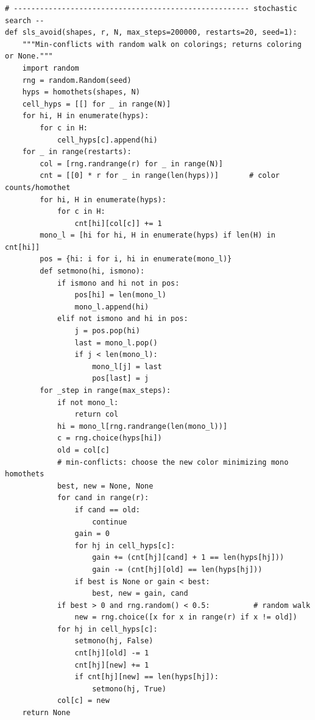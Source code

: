 \documentclass[12pt]{article}
\begin{document}
\begin{lstlisting}[style=plainstyle]
# ------------------------------------------------------ stochastic search --
def sls_avoid(shapes, r, N, max_steps=200000, restarts=20, seed=1):
    """Min-conflicts with random walk on colorings; returns coloring or None."""
    import random
    rng = random.Random(seed)
    hyps = homothets(shapes, N)
    cell_hyps = [[] for _ in range(N)]
    for hi, H in enumerate(hyps):
        for c in H:
            cell_hyps[c].append(hi)
    for _ in range(restarts):
        col = [rng.randrange(r) for _ in range(N)]
        cnt = [[0] * r for _ in range(len(hyps))]       # color counts/homothet
        for hi, H in enumerate(hyps):
            for c in H:
                cnt[hi][col[c]] += 1
        mono_l = [hi for hi, H in enumerate(hyps) if len(H) in cnt[hi]]
        pos = {hi: i for i, hi in enumerate(mono_l)}
        def setmono(hi, ismono):
            if ismono and hi not in pos:
                pos[hi] = len(mono_l)
                mono_l.append(hi)
            elif not ismono and hi in pos:
                j = pos.pop(hi)
                last = mono_l.pop()
                if j < len(mono_l):
                    mono_l[j] = last
                    pos[last] = j
        for _step in range(max_steps):
            if not mono_l:
                return col
            hi = mono_l[rng.randrange(len(mono_l))]
            c = rng.choice(hyps[hi])
            old = col[c]
            # min-conflicts: choose the new color minimizing mono homothets
            best, new = None, None
            for cand in range(r):
                if cand == old:
                    continue
                gain = 0
                for hj in cell_hyps[c]:
                    gain += (cnt[hj][cand] + 1 == len(hyps[hj]))
                    gain -= (cnt[hj][old] == len(hyps[hj]))
                if best is None or gain < best:
                    best, new = gain, cand
            if best > 0 and rng.random() < 0.5:          # random walk
                new = rng.choice([x for x in range(r) if x != old])
            for hj in cell_hyps[c]:
                setmono(hj, False)
                cnt[hj][old] -= 1
                cnt[hj][new] += 1
                if cnt[hj][new] == len(hyps[hj]):
                    setmono(hj, True)
            col[c] = new
    return None


\end{lstlisting}
\end{document}

